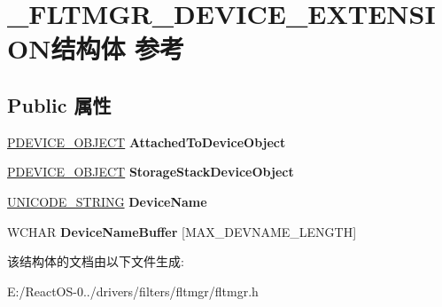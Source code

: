 \hypertarget{struct___f_l_t_m_g_r___d_e_v_i_c_e___e_x_t_e_n_s_i_o_n}{}\section{\+\_\+\+F\+L\+T\+M\+G\+R\+\_\+\+D\+E\+V\+I\+C\+E\+\_\+\+E\+X\+T\+E\+N\+S\+I\+O\+N结构体 参考}
\label{struct___f_l_t_m_g_r___d_e_v_i_c_e___e_x_t_e_n_s_i_o_n}
\subsection*{Public 属性}
\begin{DoxyCompactItemize}
\item 
\mbox{\label{struct___f_l_t_m_g_r___d_e_v_i_c_e___e_x_t_e_n_s_i_o_n_a2d1d1e93cd7a29848928e568efc843f5}} 
\hyperlink{struct___d_e_v_i_c_e___o_b_j_e_c_t}{P\+D\+E\+V\+I\+C\+E\+\_\+\+O\+B\+J\+E\+CT} {\bfseries Attached\+To\+Device\+Object}
\item 
\mbox{\label{struct___f_l_t_m_g_r___d_e_v_i_c_e___e_x_t_e_n_s_i_o_n_ac6b45fe73ca8f5677c09720ec17d5ae5}} 
\hyperlink{struct___d_e_v_i_c_e___o_b_j_e_c_t}{P\+D\+E\+V\+I\+C\+E\+\_\+\+O\+B\+J\+E\+CT} {\bfseries Storage\+Stack\+Device\+Object}
\item 
\mbox{\label{struct___f_l_t_m_g_r___d_e_v_i_c_e___e_x_t_e_n_s_i_o_n_a9675bc5aa116a6751b43befb14b0c316}} 
\hyperlink{struct___u_n_i_c_o_d_e___s_t_r_i_n_g}{U\+N\+I\+C\+O\+D\+E\+\_\+\+S\+T\+R\+I\+NG} {\bfseries Device\+Name}
\item 
\mbox{\label{struct___f_l_t_m_g_r___d_e_v_i_c_e___e_x_t_e_n_s_i_o_n_a916feee0b731d71cdf67b49bec791f9b}} 
W\+C\+H\+AR {\bfseries Device\+Name\+Buffer} \mbox{[}M\+A\+X\+\_\+\+D\+E\+V\+N\+A\+M\+E\+\_\+\+L\+E\+N\+G\+TH\mbox{]}
\end{DoxyCompactItemize}


该结构体的文档由以下文件生成\+:\begin{DoxyCompactItemize}
\item 
E\+:/\+React\+O\+S-\/0../drivers/filters/fltmgr/fltmgr.\+h\end{DoxyCompactItemize}
